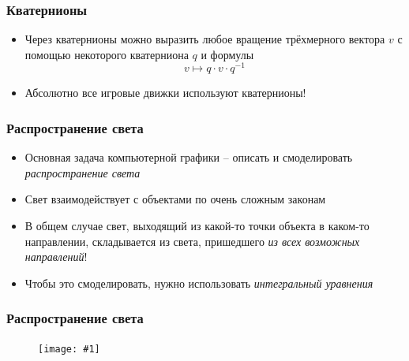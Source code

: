 \documentclass[10pt]{beamer}
\newcommand{\slideimage}[1]{
  \begin{figure}
    \begin{adjustbox}{width=\textwidth, totalheight=\textheight-2\baselineskip-2\baselineskip,keepaspectratio}
      \texttt{[image: \#1]}
    \end{adjustbox}
  \end{figure}
}
\begin{document}
\begin{frame}
\frametitle{Кватернионы}
\begin{itemize}
\item Через кватернионы можно выразить любое вращение трёхмерного вектора \begin{math}v\end{math} с помощью некоторого кватерниона \begin{math}q\end{math} и формулы
\begin{equation*}
v \mapsto q\cdot v \cdot q^{-1}
\end{equation*}
\pause
\item Абсолютно все игровые движки используют кватернионы!
\end{itemize}
\end{frame}

\begin{frame}
\frametitle{Распространение света}
\begin{itemize}
\item Основная задача компьютерной графики -- описать и смоделировать \textit{распространение света}
\pause
\item Свет взаимодействует с объектами по очень сложным законам
\pause
\item В общем случае свет, выходящий из какой-то точки объекта в каком-то направлении, складывается из света, пришедшего \textit{из всех возможных направлений}!
\pause
\item Чтобы это смоделировать, нужно использовать \textit{интегральный уравнения}
\end{itemize}
\end{frame}

\begin{frame}
\frametitle{Распространение света}
\slideimage{rendering_equation.png}
\end{frame}
\end{document}
